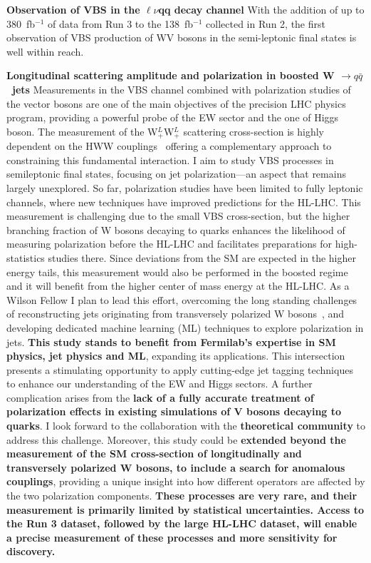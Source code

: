 {\begin{flushleft}
\textbf{Observation of VBS in the $\ell\nu$qq decay channel} With the addition of up to 380~fb$^{-1}$ of data from Run 3 to the 138~fb$^{-1}$ collected in Run 2, the first observation of VBS production of WV bosons in the semi-leptonic final states is well within reach.

\textbf{Longitudinal scattering amplitude and polarization in boosted W $\to q\bar{q}$ \ jets}
Measurements in the VBS channel combined with polarization studies of the vector bosons are one of the main objectives of the precision LHC physics program, providing a powerful probe of the EW sector and the one of Higgs boson.
The measurement of the  W$^L_+$W$^L_+$ scattering cross-section is highly dependent on the HWW couplings~\cite{[4]} offering a complementary approach to constraining this fundamental interaction.
I aim to study VBS processes in semileptonic final states, focusing on jet polarization—an aspect that remains largely unexplored. So far, polarization studies have been limited to fully leptonic channels, where new techniques have improved predictions for the HL-LHC. This measurement is challenging due to the small VBS cross-section, but the higher branching fraction of W bosons decaying to quarks enhances the likelihood of measuring polarization before the HL-LHC and facilitates preparations for high-statistics studies there. Since deviations from the SM are expected in the higher energy tails, this measurement would also be performed in the boosted regime and it will benefit from the higher center of mass energy at the HL-LHC. As a Wilson Fellow I plan to lead this effort, overcoming the long standing challenges of reconstructing jets originating from transversely polarized W bosons~\cite{[5]}, and developing dedicated machine learning (ML) techniques to explore polarization in jets.
\textbf{This study stands to benefit from Fermilab’s expertise in SM physics, jet physics and ML}, expanding its applications. This intersection presents a stimulating opportunity to apply cutting-edge jet tagging techniques to enhance our understanding of the EW and Higgs sectors.
A further complication arises from the {\bf lack of a fully accurate treatment of polarization effects in existing simulations of V bosons decaying to quarks}. I look forward to the collaboration with the {\bf theoretical community} to address this challenge.  
Moreover, this study could be {\bf extended beyond the measurement of the SM cross-section of longitudinally and transversely polarized W bosons, to include a search for anomalous couplings}, providing a unique insight into how different operators are affected by the two polarization components.
{\bf These processes are very rare, and their measurement is primarily limited by statistical uncertainties. Access to the Run 3 dataset, followed by the large HL-LHC dataset, will enable a precise measurement of these processes and more sensitivity for discovery.}


\end{flushleft}}
